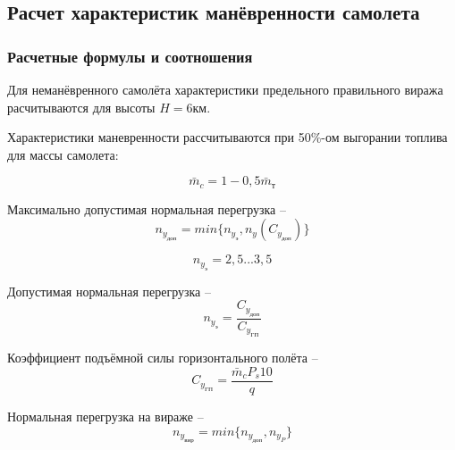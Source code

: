 \subsection{Расчет характеристик манёвренности самолета}
\label{sec:Расчёт характеристик манёвренности самолёта}
\pagestyle{fancy}
\fancyhf{}
\rfoot{\thepage}

\subsubsection{Расчетные формулы и соотношения}

Для неманёвренного самолёта характеристики предельного правильного виража расчитываются для высоты $H = 6$км.

Характеристики маневренности рассчитываются при 50\%-ом выгорании топлива для
массы самолета: 

\begin{equation}
    \label{eq:Относительная масса смолёта}
    \bar{m}_c = 1-0,5\bar{m}_\text{т}
\end{equation}

Максимально допустимая нормальная перегрузка -- 
\begin{equation}
    \label{eq:Максимально допустимая нормальная перегрузка}
    n_{y_\text{доп}} = min \{n_{y_\text{э}},n_{y}(C_{y_\text{доп}}) \}
\end{equation}

\begin{equation}
    \label{eq:Эксплуатационная перегрузка}
    n_{y_\text{э}} = 2,5...3,5
\end{equation}

Допустимая нормальная перегрузка -- 
\begin{equation}
    \label{eq:Допустимая нормальная перегрузка}
    n_{y_\text{э}} = \frac{C_{y_\text{доп}}}{C_{y_\text{ГП}}}
\end{equation}

Коэффициент подъёмной силы горизонтального полёта --
\begin{equation}
    \label{eq:Коэффициент подъёмной силы горизонтального полёта}
    C_{y_\text{ГП}} = \frac{\bar{m}_cP_s10}{q}
\end{equation}

Нормальная перегрузка на вираже --
\begin{equation}
    \label{eq:Нормальная перегрузка на вираже}
    n_{y_\text{вир}} = min \{ n_{y_\text{доп}}, n_{y_P} \}
\end{equation}

